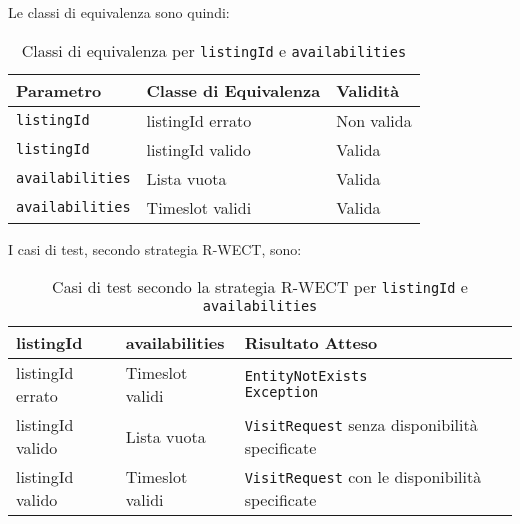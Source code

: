 Le classi di equivalenza sono quindi:
\begin{table}[H]
    \centering
    \renewcommand{\arraystretch}{1.4}
    \begin{tabularx}{\textwidth}{|X|X|X|}
    \hline
    \textbf{Parametro} & \textbf{Classe di Equivalenza} & \textbf{Validità} \\
    \hline
    \texttt{listingId} & listingId errato & Non valida \\
    \hline
    \texttt{listingId} & listingId valido & Valida \\
    \hline
    \texttt{availabilities} & Lista vuota & Valida \\
    \hline
    \texttt{availabilities} & Timeslot validi & Valida \\
    \hline
    \end{tabularx}
    \caption{Classi di equivalenza per \texttt{listingId} e \texttt{availabilities}}
\end{table}

I casi di test, secondo strategia R-WECT, sono:
\begin{table}[H]
    \centering
    \renewcommand{\arraystretch}{1.4}
    \begin{tabularx}{\textwidth}{|X|X|X|}
    \hline
    \textbf{listingId} & \textbf{availabilities} & \textbf{Risultato Atteso} \\
    \hline
    listingId errato & Timeslot validi & \makecell[l]{\texttt{EntityNotExists}\\\texttt{Exception}} \\
    \hline
    listingId valido & Lista vuota & \texttt{VisitRequest} senza disponibilità specificate \\
    \hline
    listingId valido & Timeslot validi & \texttt{VisitRequest} con le disponibilità specificate \\
    \hline
    \end{tabularx}
    \caption{Casi di test secondo la strategia R-WECT per \texttt{listingId} e \texttt{availabilities}}
    \end{table}

\newpage
